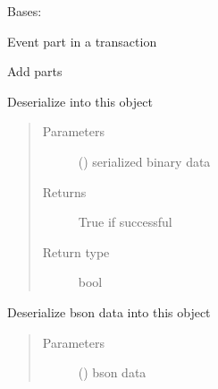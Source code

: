 \documentclass[letterpaper,10pt,english]{sphinxmanual}
\begin{document}
\begin{fulllineitems}
\label{\detokenize{bbc1.core.bbclib:bbc1.core.bbclib.BBcEvent}}
Bases: 

Event part in a transaction

\begin{fulllineitems}
\label{\detokenize{bbc1.core.bbclib:bbc1.core.bbclib.BBcEvent.add}}
Add parts

\end{fulllineitems}


\begin{fulllineitems}
\label{\detokenize{bbc1.core.bbclib:bbc1.core.bbclib.BBcEvent.deserialize}}
Deserialize into this object
\begin{quote}\begin{description}
\item[{Parameters}] \leavevmode
{} () \textendash{} serialized binary data

\item[{Returns}] \leavevmode
True if successful

\item[{Return type}] \leavevmode
bool

\end{description}\end{quote}

\end{fulllineitems}


\begin{fulllineitems}
\label{\detokenize{bbc1.core.bbclib:bbc1.core.bbclib.BBcEvent.deserialize_bson}}
Deserialize bson data into this object
\begin{quote}\begin{description}
\item[{Parameters}] \leavevmode
{} () \textendash{} bson data


\end{description}
\end{quote}
\end{fulllineitems}
\end{fulllineitems}
\end{document}
